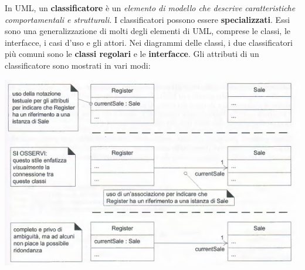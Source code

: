 \documentclass[a4paper,12pt, oneside]{book}
\begin{document}
In UML, un \textbf{classificatore} è un \textit{elemento di modello che descrive caratteristiche comportamentali e strutturali}. I classificatori possono essere \textbf{specializzati}. Essi sono una generalizzazione di molti degli elementi di UML, comprese le classi, le
interfacce, i casi d'uso e gli attori. Nei diagrammi delle classi, i due classificatori più comuni sono le \textbf{classi regolari} e le \textbf{interfacce}. Gli attributi di un classificatore sono mostrati in vari modi:
\begin{center}
	\includegraphics[scale=0.7]{img/clasd3.png}
\end{center}
\end{document}
